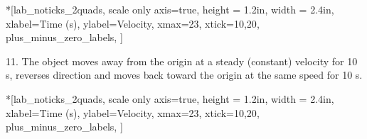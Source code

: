 \begin{lab_axis}*[lab_noticks_2quads,
	scale only axis=true,
	height = {1.2in}, width = {2.4in},
	xlabel={Time (s)},
	ylabel={Velocity},
	xmax=23,
	xtick={10,20},
	plus_minus_zero_labels,
	]
\end{lab_axis}


11. The object moves away from the origin at a steady (constant) velocity for
10 s, reverses direction and moves back toward the origin at the same speed
for 10 s.

\begin{lab_axis}*[lab_noticks_2quads,
	scale only axis=true,
	height = {1.2in}, width = {2.4in},
	xlabel={Time (s)},
	ylabel={Velocity},
	xmax=23,
	xtick={10,20},
	plus_minus_zero_labels,
	]
\end{lab_axis}


